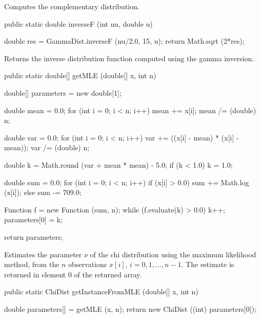   \begin{tabb}
  Computes the complementary distribution.
 \end{tabb}
\begin{code}

   public static double inverseF (int nu, double u)\begin{hide} {
       double res =  GammaDist.inverseF (nu/2.0, 15, u);
       return Math.sqrt (2*res);
   }\end{hide}
\end{code}
\begin{tabb}  Returns the inverse distribution function computed
  using the gamma inversion.
\end{tabb}
\begin{code}

   public static double[] getMLE (double[] x, int n)\begin{hide} {
      double[] parameters = new double[1];

      double mean = 0.0;
      for (int i = 0; i < n; i++)
         mean += x[i];
      mean /= (double) n;

      double var = 0.0;
      for (int i = 0; i < n; i++)
         var += ((x[i] - mean) * (x[i] - mean));
      var /= (double) n;

      double k = Math.round (var + mean * mean) - 5.0;
      if (k < 1.0)
         k = 1.0;

      double sum = 0.0;
      for (int i = 0; i < n; i++) {
         if (x[i] > 0.0)
            sum += Math.log (x[i]);
         else
            sum -= 709.0;
      }

      Function f = new Function (sum, n);
      while (f.evaluate(k) > 0.0)
         k++;
      parameters[0] = k;

      return parameters;
   }\end{hide}
\end{code}
\begin{tabb}
   Estimates the parameter $\nu$ of the chi distribution
   using the maximum likelihood method, from the $n$ observations
   $x[i]$, $i = 0, 1, \ldots, n-1$. The estimate is returned in element 0
   of the returned array.
\end{tabb}
\begin{htmlonly}
\end{htmlonly}
\begin{code}

   public static ChiDist getInstanceFromMLE (double[] x, int n)\begin{hide} {
      double parameters[] = getMLE (x, n);
      return new ChiDist ((int) parameters[0]);
   }\end{hide}
\end{code}
